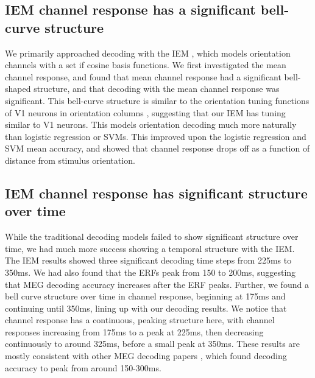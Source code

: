 \documentclass[../main.tex]{subfiles}
\begin{document}
\subsection{IEM channel response has a significant bell-curve structure}
We primarily approached decoding with the IEM \citep{Brouwer09, Brouwer, sprague_serences_2013, GARCIA2013515, sprague_saproo_serences_2015}, which models orientation channels with a set if cosine basis functions. We first investigated the mean channel response, and found that mean channel response had a significant bell-shaped structure, and that decoding with the mean channel response was significant. This bell-curve structure is similar to the orientation tuning functions of V1 neurons in orientation columns \citep{devalois_1978}, suggesting that our IEM has tuning similar to V1 neurons. This models orientation decoding much more naturally than logistic regression or SVMs. This improved upon the logistic regression and SVM mean accuracy, and showed that channel response drops off as a function of distance from stimulus orientation.

\subsection{IEM channel response has significant structure over time}
While the traditional decoding models failed to show significant structure over time, we had much more success showing a temporal structure with the IEM. The IEM results showed three significant decoding time steps from 225ms to 350ms. We had also found that the ERFs peak from 150 to 200ms, suggesting that MEG decoding accuracy increases after the ERF peaks. Further, we found a bell curve structure over time in channel response, beginning at 175ms and continuing until 350ms, lining up with our decoding results. We notice that channel response has a continuous, peaking structure here, with channel responses increasing from 175ms to a peak at 225ms, then decreasing continuously to around 325ms, before a small peak at 350ms. These results are mostly consistent with other MEG decoding papers \citep{cichy_ramirez_pantazis_2015, pantazis_fang_qin_mohsenzadeh_li_cichy_2018}, which found decoding accuracy to peak from around 150-300ms.
\end{document}
